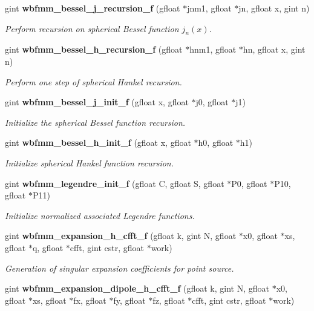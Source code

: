 \begin{DoxyCompactItemize}
gint {\bf wbfmm\+\_\+bessel\+\_\+j\+\_\+recursion\+\_\+f} (gfloat $\ast$jnm1, gfloat $\ast$jn, gfloat x, gint n)
\begin{DoxyCompactList}\small\item\em Perform recursion on spherical Bessel function $j_{n}(x)$. \end{DoxyCompactList}\item 
gint {\bf wbfmm\+\_\+bessel\+\_\+h\+\_\+recursion\+\_\+f} (gfloat $\ast$hnm1, gfloat $\ast$hn, gfloat x, gint n)
\begin{DoxyCompactList}\small\item\em Perform one step of spherical Hankel recursion. \end{DoxyCompactList}\item 
gint {\bf wbfmm\+\_\+bessel\+\_\+j\+\_\+init\+\_\+f} (gfloat x, gfloat $\ast$j0, gfloat $\ast$j1)
\begin{DoxyCompactList}\small\item\em Initialize the spherical Bessel function recursion. \end{DoxyCompactList}\item 
gint {\bf wbfmm\+\_\+bessel\+\_\+h\+\_\+init\+\_\+f} (gfloat x, gfloat $\ast$h0, gfloat $\ast$h1)
\begin{DoxyCompactList}\small\item\em Initialize spherical Hankel function recursion. \end{DoxyCompactList}\item 
gint {\bf wbfmm\+\_\+legendre\+\_\+init\+\_\+f} (gfloat C, gfloat S, gfloat $\ast$P0, gfloat $\ast$P10, gfloat $\ast$P11)
\begin{DoxyCompactList}\small\item\em Initialize normalized associated Legendre functions. \end{DoxyCompactList}\item 
gint {\bf wbfmm\+\_\+expansion\+\_\+h\+\_\+cfft\+\_\+f} (gfloat k, gint N, gfloat $\ast$x0, gfloat $\ast$xs, gfloat $\ast$q, gfloat $\ast$cfft, gint cstr, gfloat $\ast$work)
\begin{DoxyCompactList}\small\item\em Generation of singular expansion coefficients for point source. \end{DoxyCompactList}\item 
gint {\bf wbfmm\+\_\+expansion\+\_\+dipole\+\_\+h\+\_\+cfft\+\_\+f} (gfloat k, gint N, gfloat $\ast$x0, gfloat $\ast$xs, gfloat $\ast$fx, gfloat $\ast$fy, gfloat $\ast$fz, gfloat $\ast$cfft, gint cstr, gfloat $\ast$work)

\end{DoxyCompactItemize}
